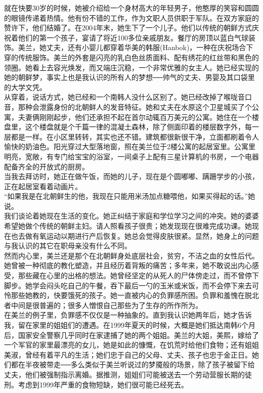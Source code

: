 就在快要30岁的时候，她被介绍给一个身材高大的年轻男子，他憨厚的笑容和圆圆的眼镜传递着热情。他有份不错的工作，作为文职人员供职于军队。在双方家庭的赞许下，他们结婚了。在2004年末，她生下了一个儿子。他们以传统的朝鲜方式庆祝着他们的第一个孩子，宴请了将近100多位亲戚朋友。餐厅的房顶以蓝白气球装饰。美兰，她丈夫，还有小婴儿都穿着华美的韩服(Hanbok)，一种在庆祝场合下穿的传统服饰。美兰的外套是闪亮的乳白色丝质面料、配有绣花的红丝带和黑色的领圈。她看上去容光焕发，而又端庄沉稳，一个非常优雅的女主人。她已经实现的她的朝鲜梦，事实上也是我认识的所有人的梦想──帅气的丈夫、男婴及其口袋里的大学文凭。\\

从穿着，说话方式，她已经和一个南韩人没什么区别了。她已经改掉了喉咙音口音，那种会泄露身份的北朝鲜人的发音特征。她和丈夫在水原这个卫星城买了个公寓，夫妻俩刚刚起步，他们还承担不起在首尔动辄百万美元的公寓。她住在一个楼盘里，这个楼盘就是个千篇一律的混凝土森林，除了侧面印着的楼层数字外，每一层都是一样。在小区里转转，其实也还不错。建筑都很新很干净，立面都刷着令人愉快的奶油色。阳光穿过大型落地窗，照在美兰位于2楼公寓的起居室里。公寓里明亮，宽敞，有专门给宝宝的浴室，一间桌子上配有三星计算机的书房，一个电器配备齐全的开放式的厨房。\\

当我去拜访时，她正在做午饭，而她的儿子，现在是个圆嘟嘟、蹒跚学步的小孩，正在起居室看着动画片。\\

“如果我是在北朝鲜生的他，我现在只能用米汤加点糖喂他，如果买得起的话。”她说。\\

我们谈论着她现在生活的变化。她正纠结于家庭和学位学习之间的冲突。她的婆婆希望她做个传统的朝鲜主妇。请人照看孩子很贵；她发现现在很难完成功课。她现在也去做有氧运动以期进行产后恢复。她总会觉得皮肤很紧。显然，她身上的问题与我认识的其它在职母亲没有什么不同。\\

然而内心里，美兰还是那个在北朝鲜身处底层社会，贫穷，不洁之血的女性后代。她曾被一种彻底的教化塑造，并且经历着背叛的痛苦；多年来，她不敢说出内心感受，那些藏在心里的出格的想法。她曾经坚定的从死人的尸体傍走过，而不曾停下脚步。她学会闷头吃自己的午餐，吞下最后一勺的玉米或米饭，而不会停下来去可怜那些她教的，快要饿死的孩子。她一直被内心的负罪感所困。负罪和羞愧在脱北者中间是很普遍的；很多人憎恨自己那些为了生存的所作所为。\\

在美兰的例子里，负罪感不仅仅是一种抽象的。直到我认识她两年后，她才告诉我，留在家里的姐姐们的遭遇。在1999年夏天的时候，大概是她们抵达南韩6个月后，国家安全警察几乎同时在家逮捕了她的两个姐姐。美兰的大姐，美熙，嫁给了一个军官的家里最漂亮的女儿，她是如此的慷慨，在饥荒时给他们食物；还有姐姐美淑，曾经有着平凡的生活；她们忠于自己的父母、丈夫、孩子也忠于金正日。她们都在半夜被带走──多么类似于美兰听说过的梦魇般的场景，除了孩子被留下给丈夫，他们被强制指示离婚。据推测，姐姐们可能被送去一个劳动营服长期的徒刑。考虑到1999年严重的食物短缺，她们很可能已经死去。\\

